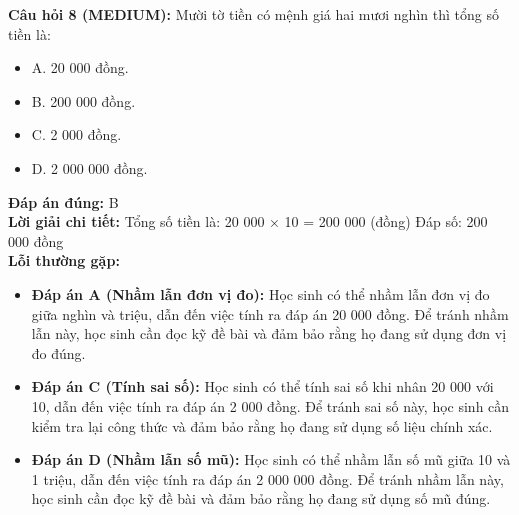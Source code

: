 \documentclass{article}
\begin{document}
\begin{minipage}{\textwidth}
\noindent\textbf{Câu hỏi 8 (MEDIUM):} Mười tờ tiền có mệnh giá hai mươi nghìn thì tổng số tiền là: 
\begin{itemize}[label={}]
    \item A. 20 000 đồng.
    \item B. 200 000 đồng.
    \item C. 2 000 đồng.
    \item D. 2 000 000 đồng.
\end{itemize}
\textbf{Đáp án đúng:} B \\
\textbf{Lời giải chi tiết:} Tổng số tiền là: 20 000 × 10 = 200 000 (đồng) Đáp số: 200 000 đồng \\
\textbf{Lỗi thường gặp:}
\begin{itemize}
  \item \textbf{Đáp án A (Nhầm lẫn đơn vị đo):} Học sinh có thể nhầm lẫn đơn vị đo giữa nghìn và triệu, dẫn đến việc tính ra đáp án 20 000 đồng. Để tránh nhầm lẫn này, học sinh cần đọc kỹ đề bài và đảm bảo rằng họ đang sử dụng đơn vị đo đúng.
  \item \textbf{Đáp án C (Tính sai số):} Học sinh có thể tính sai số khi nhân 20 000 với 10, dẫn đến việc tính ra đáp án 2 000 đồng. Để tránh sai số này, học sinh cần kiểm tra lại công thức và đảm bảo rằng họ đang sử dụng số liệu chính xác.
  \item \textbf{Đáp án D (Nhầm lẫn số mũ):} Học sinh có thể nhầm lẫn số mũ giữa 10 và 1 triệu, dẫn đến việc tính ra đáp án 2 000 000 đồng. Để tránh nhầm lẫn này, học sinh cần đọc kỹ đề bài và đảm bảo rằng họ đang sử dụng số mũ đúng.
\end{itemize}
\end{minipage}
\vspace{1em}
\end{document}
